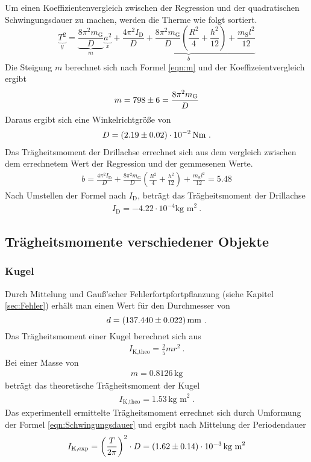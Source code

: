 Um einen Koeffizientenvergleich zwischen der Regression und der quadratischen Schwingungsdauer zu machen, werden die Therme wie folgt sortiert.
\begin{equation}
	\underbrace{T^2}_y = \underbrace{\frac{8 \pi^2 m_\text{G}}{D}}_m \underbrace{a^2}_x + \underbrace{\frac{4 \pi^2 I_\text{D}}{D} + \frac{8\pi^2 m_\text{G}}{D} \left( \frac{R^2}{4} + \frac{h^2}{12} \right) + \frac{m_\text{S} l^2}{12}}_b
\end{equation}
Die Steigung $m$ berechnet sich nach Formel \ref{eqn:m} und der Koeffizeientvergleich ergibt
\begin{align}
	m = \num{798+- 6} = \frac{8 \pi^2 m_\text{G}}{D}
\end{align}
Daraus ergibt sich eine Winkelrichtgröße von
\begin{align}
	D = (\num{2.19 +- 0.02}) \cdot 10^{-2} \, \text{Nm} \ .
\end{align}
Das Trägheitsmoment der Drillachse errechnet sich aus dem vergleich zwischen dem errechnetem Wert der Regression und der gemmesenen Werte.
\begin{align}
	b = \frac{4 \pi^2 I_\text{D}}{D} + \frac{8\pi^2 m_\text{G}}{D} \left( \frac{R^2}{4} + \frac{h^2}{12} \right) + \frac{m_\text{S} l^2}{12} = 5.48
\end{align}
Nach Umstellen der Formel nach $I_\text{D}$, beträgt das Trägheitsmoment der Drillachse
\begin{align*}
	I_\text{D} = -4.22 \cdot 10^{-4} \text{kg m}^2 \ .
\end{align*}




\subsection{Trägheitsmomente verschiedener Objekte}
\subsubsection{Kugel}
Durch Mittelung und Gauß'scher Fehlerfortpfortpflanzung (siehe Kapitel \ref{sec:Fehler}) erhält man einen Wert für den Durchmesser von
\begin{equation}
	d = (\num{137.44 +- 0.022}) \, \text{mm} \ .
\end{equation}
Das Trägheitsmoment einer Kugel berechnet sich aus
\begin{align}
	I_\text{K,theo} = \frac{2}{5} mr^2 \ .
\end{align}
Bei einer Masse von
\begin{align*}
	m = 0.8126 \, \text{kg}
\end{align*}
beträgt das theoretische Trägheitsmoment der Kugel
\begin{align}
	I_\text{K,theo} = 1.53 \, \text{kg m}^2 \ .
\end{align}
Das experimentell ermittelte Trägheitsmoment errechnet sich durch Umformung der Formel \ref{eqn:Schwingungsdauer} und ergibt nach Mittelung der Periodendauer
\begin{equation}
	\label{eqn:T_K}
	I_\text{K,exp} = \left( \frac{T}{2 \pi} \right) ^2 \cdot D = (\num{1.62 +- 0.14}) \cdot 10^{-3} \, \text{kg m}^2
\end{equation}


